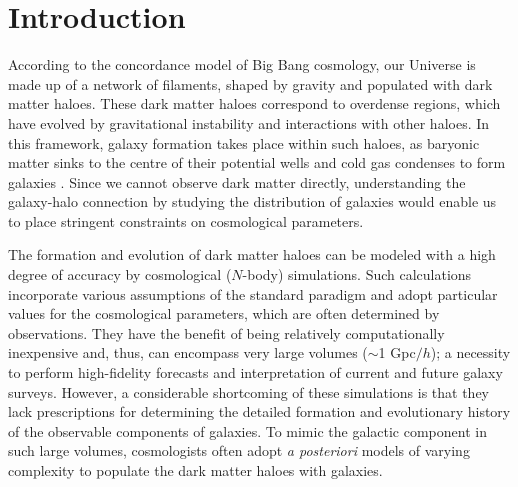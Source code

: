 \documentclass[fleqn,usenatbib]{mnras}
\begin{document}
\section{Introduction}
\label{sec:intro}
According to the concordance model of Big Bang cosmology, our Universe is made up of a network of filaments, shaped by gravity and populated with dark matter haloes. These dark matter haloes correspond to overdense regions, which have evolved by gravitational instability and interactions with other haloes. In this framework, galaxy formation takes place within such haloes, as baryonic matter sinks to the centre of their potential wells and cold gas condenses to form galaxies \citep{1978MNRAS.183..341W}. Since we cannot observe dark matter directly, understanding the galaxy-halo connection by studying the distribution of galaxies would enable us to place stringent constraints on cosmological parameters.

The formation and evolution of dark matter haloes can be modeled with a high degree of accuracy by cosmological ($N$-body) simulations. Such calculations incorporate various assumptions of the standard paradigm and adopt particular values for the cosmological parameters, which are often determined by observations. They have the benefit of being relatively computationally inexpensive and, thus, can encompass very large volumes ($\sim$1 Gpc$/h$); a necessity to perform high-fidelity forecasts and interpretation of current and future galaxy surveys. However, a considerable shortcoming of these simulations is that they lack prescriptions for determining the detailed formation and evolutionary history of the observable components of galaxies. To mimic the galactic component in such large volumes, cosmologists often adopt \textit{a posteriori} models of varying complexity to populate the dark matter haloes with galaxies. 
\end{document}
